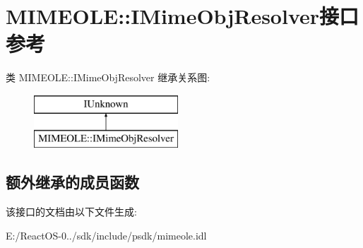 \hypertarget{interface_m_i_m_e_o_l_e_1_1_i_mime_obj_resolver}{}\section{M\+I\+M\+E\+O\+LE\+:\+:I\+Mime\+Obj\+Resolver接口 参考}
\label{interface_m_i_m_e_o_l_e_1_1_i_mime_obj_resolver}
类 M\+I\+M\+E\+O\+LE\+:\+:I\+Mime\+Obj\+Resolver 继承关系图\+:\begin{figure}[H]
\begin{center}
\leavevmode
\includegraphics[height=2.000000cm]{interface_m_i_m_e_o_l_e_1_1_i_mime_obj_resolver}
\end{center}
\end{figure}
\subsection*{额外继承的成员函数}


该接口的文档由以下文件生成\+:\begin{DoxyCompactItemize}
\item 
E\+:/\+React\+O\+S-\/0../sdk/include/psdk/mimeole.\+idl\end{DoxyCompactItemize}
